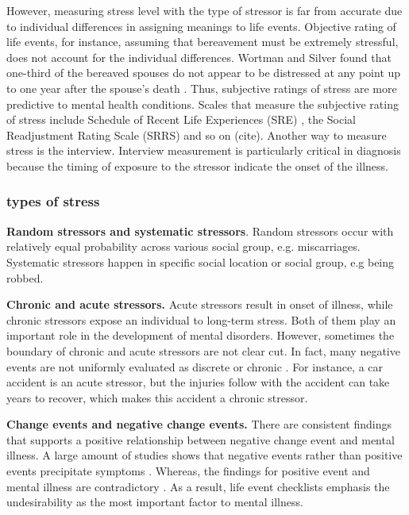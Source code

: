 However, measuring stress level with the type of stressor is far from accurate due to individual differences in assigning meanings to life events. Objective rating of life events, for instance, assuming that bereavement must be extremely stressful, does not account for the individual differences.  Wortman and Silver found that one-third of the bereaved spouses do not appear to be distressed at any point up to one year after the spouse's death \cite{wortman1989myths}. Thus, subjective ratings of stress are more predictive to mental health conditions.  Scales that measure the subjective rating of stress include Schedule of Recent Life Experiences (SRE) \cite{nuckolls1972psychosocial}, the Social Readjustment Rating Scale (SRRS) and so on (cite). Another way to measure stress is the interview. Interview measurement is particularly critical in diagnosis because the timing of exposure to the stressor indicate the onset of the illness.


\subsubsection{types of stress}
\textbf{Random stressors and systematic stressors}. Random stressors occur with relatively equal probability across various social group, e.g. miscarriages. Systematic stressors happen in specific social location or social group, e.g being robbed. 

\textbf{Chronic and acute stressors.}  Acute stressors result in onset of illness, while chronic stressors expose an individual to long-term stress. Both of them play an important role in the development of mental disorders. However, sometimes the boundary of chronic and acute stressors are not clear cut. In fact, many negative events are not uniformly evaluated as discrete or chronic \cite{avison1988stressful}. For instance, a car accident is an acute stressor, but the injuries follow with the accident can take years to recover, which makes this accident a chronic stressor.

\textbf{Change events and negative change events.} There are consistent findings that supports a positive relationship between negative change event and mental illness. A large amount of studies shows that negative events rather than positive events precipitate symptoms \cite{rabkin1976life,turner1995epidemiology}. Whereas, the findings for positive event and mental illness are contradictory \cite{zautra1983life}. As a result, life event checklists emphasis the undesirability as the most important factor to mental illness. 

